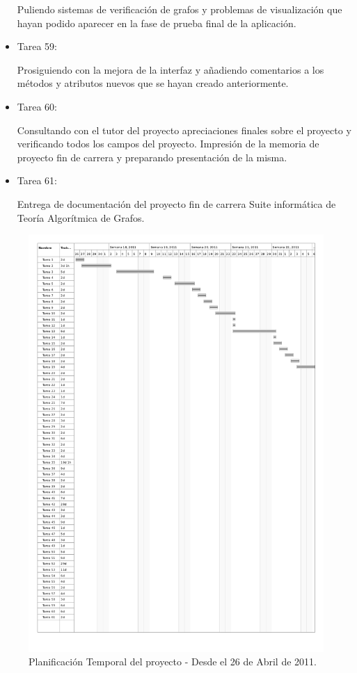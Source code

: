 \begin{itemize}
Puliendo sistemas de verificación de grafos y problemas de visualización que hayan podido aparecer en la fase de prueba final de la aplicación. \\

\item Tarea 59:

Prosiguiendo con la mejora de la interfaz y añadiendo comentarios a los métodos y atributos nuevos que se hayan creado anteriormente. \\

\item Tarea 60:

Consultando con el tutor del proyecto apreciaciones finales sobre el proyecto y verificando todos los campos del proyecto. Impresión de la memoria de proyecto fin de carrera y preparando presentación de la misma. \\

\item Tarea 61:

Entrega de documentación del proyecto fin de carrera Suite informática de Teoría Algorítmica de Grafos. \\

\end{itemize}
\vfill
\pagebreak
\begin{figure}[H]
\begin{center}
\includegraphics[width=15.5cm]{planificacion_graphvisualx_1.png}
\caption{Planificación Temporal del proyecto - Desde el 26 de Abril de 2011.}
\end{center}
\end{figure}

